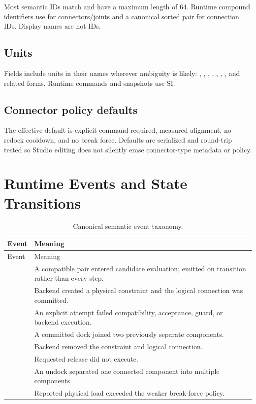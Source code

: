 Most semantic IDs match
 and have a maximum length of 64.
Runtime compound identifiers use  for connectors/joints and a
canonical sorted pair for connection IDs. Display names are not IDs.

\subsection{Units}

Fields include units in their names wherever ambiguity is likely:
, , ,
, ,
, , and related forms.
Runtime commands and snapshots use SI.

\subsection{Connector policy defaults}

The effective default is explicit command required, measured alignment, no redock
cooldown, and no break force. Defaults are serialized and round-trip tested so Studio
editing does not silently erase connector-type metadata or policy.

\section{Runtime Events and State Transitions}
\label{app:events}

\begin{longtable}{L{0.27\textwidth}L{0.58\textwidth}}
\caption{Canonical semantic event taxonomy.}
\label{tab:event-taxonomy}\\
\toprule
Event & Meaning \\
\midrule
\endfirsthead
\toprule
Event & Meaning \\
\midrule
\endhead
{} & A compatible pair entered candidate evaluation; emitted
on transition rather than every step. \\
 & Backend created a physical constraint and the logical connection
was committed. \\
 & An explicit attempt failed compatibility, acceptance, guard, or
backend execution. \\
 & A committed dock joined two previously separate components. \\
 & Backend removed the constraint and logical connection. \\
 & Requested release did not execute. \\
 & An undock separated one connected component into multiple components. \\
 & Reported physical load exceeded the weaker break-force policy. \\
\bottomrule
\end{longtable}

